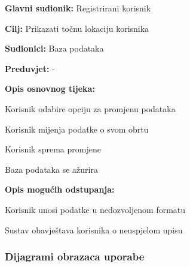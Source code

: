					\noindent {}
					\begin{packed_item}
	
						\item \textbf{Glavni sudionik: }Registrirani korisnik
						\item  \textbf{Cilj:} Prikazati točnu lokaciju korisnika
						\item  \textbf{Sudionici:} Baza podataka
						\item  \textbf{Preduvjet:} -
						\item  \textbf{Opis osnovnog tijeka:}
						
						\item[] \begin{packed_enum}
	
							\item Korisnik odabire opciju za promjenu podataka
							\item Korisnik mijenja podatke o svom obrtu
							\item Korisnik sprema promjene
							\item Baza podataka se ažurira

						\end{packed_enum}
						
						\item  \textbf{Opis mogućih odstupanja:}
						
						\item[] \begin{packed_item}
	
							\item[2.a] Korisnik unosi podatke u nedozvoljenom formatu
							\item[] \begin{packed_enum}
								
								\item Sustav obavještava korisnika o neuspjelom upisu
								
							\end{packed_enum}
							
						\end{packed_item}
						
					\end{packed_item}
					
					
				
					
				\subsubsection{Dijagrami obrazaca uporabe}
					
